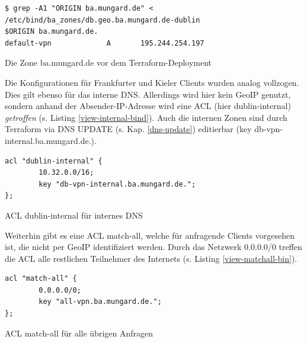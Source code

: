 \begin{listing}[h]
\begin{verbatim}
$ grep -A1 "ORIGIN ba.mungard.de" < /etc/bind/ba_zones/db.geo.ba.mungard.de-dublin
$ORIGIN ba.mungard.de.
default-vpn             A       195.244.254.197
\end{verbatim}
\caption{Die Zone ba.mungard.de vor dem Terraform-Deployment}
\label{zone-dublin-before-deployment}
\end{listing}\FloatBarrier
Die Konfigurationen für Frankfurter und Kieler \gls{Client}s wurden analog vollzogen. Dies gilt ebenso für das interne \gls{DNS}. Allerdings wird hier kein \gls{GeoIP} genutzt, sondern anhand der Absender-IP-Adresse wird eine \gls{ACL} (hier \glqq dublin-internal\grqq{}) \textit{getroffen} (s. Listing \ref{view-internal-bind}). Auch die internen \gls{Zone}n sind durch Terraform via \gls{DNS} UPDATE (s. Kap. \ref{dns-update}) editierbar (key \glqq db-vpn-internal.ba.mungard.de.\grqq{}).
\begin{listing}[h]
\begin{verbatim}
acl "dublin-internal" {
        10.32.0.0/16;
        key "db-vpn-internal.ba.mungard.de.";
};
\end{verbatim}
\caption{ACL \glqq dublin-internal\grqq{} für internes DNS}
\label{view-internal-bind}
\end{listing}\FloatBarrier
Weiterhin gibt es eine \gls{ACL} \glqq match-all\grqq{}, welche für anfragende \gls{Client}s vorgesehen ist, die nicht per \gls{GeoIP} identifiziert werden. Durch das Netzwerk 0.0.0.0/0 treffen die \gls{ACL} alle restlichen Teilnehmer des Internets (s. Listing \ref{view-matchall-bin}).
\begin{listing}[h]
\begin{verbatim}
acl "match-all" {
        0.0.0.0/0;
        key "all-vpn.ba.mungard.de.";
};
\end{verbatim}
\caption{ACL \glqq match-all\grqq{} für alle übrigen Anfragen}
\label{view-matchall-bin}
\end{listing}\FloatBarrier

